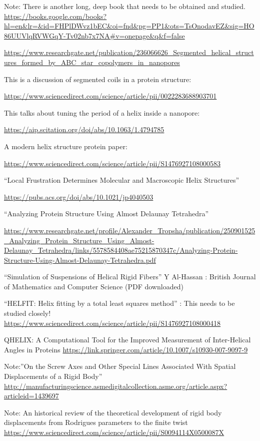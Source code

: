 \documentclass[11pt]{article}
\begin{document}
{Note: There is another long, deep book that needs to be obtained and studied\cite{sadoc2006geometrical}.
\url{https://books.google.com/books?hl=en&lr=&id=FHPlDWvz1bEC&oi=fnd&pg=PP1&ots=TsOnodavEZ&sig=HO86UUVlqRVWGqY-Tv02nb7x7NA#v=onepage&q&f=false}

\url{https://www.researchgate.net/publication/236066626_Segmented_helical_structures_formed_by_ABC_star_copolymers_in_nanopores}

This is a discussion of segmented coils in a protein structure:

\url{https://www.sciencedirect.com/science/article/pii/0022283688903701}

This talks about tuning the period of a helix inside a nanopore:

\url{https://aip.scitation.org/doi/abs/10.1063/1.4794785}

A modern helix structure protein paper:

\url{https://www.sciencedirect.com/science/article/pii/S1476927108000583}

``Local Frustration Determines Molecular and Macroscopic Helix Structures''

\url{https://pubs.acs.org/doi/abs/10.1021/jp4040503}

``Analyzing Protein Structure Using Almost Delaunay Tetrahedra''

\url{https://www.researchgate.net/profile/Alexander_Tropsha/publication/250901525_Analyzing_Protein_Structure_Using_Almost-Delaunay_Tetrahedra/links/5578584408ae75215870347c/Analyzing-Protein-Structure-Using-Almost-Delaunay-Tetrahedra.pdf}

``Simulation of Suspensions of Helical Rigid Fibers'' Y Al-Hassan : British Journal of Mathematics and Computer Science
(PDF downloaded)

``HELFIT: Helix fitting by a total least squares method'' : This needs to be studied closely!
\url{https://www.sciencedirect.com/science/article/pii/S1476927108000418}

QHELIX: A Computational Tool for the Improved Measurement of Inter-Helical Angles in Proteins
\url{https://link.springer.com/article/10.1007/s10930-007-9097-9}

Note:''On the Screw Axes and Other Special Lines Associated With Spatial Displacements of a Rigid Body''
\url{http://manufacturingscience.asmedigitalcollection.asme.org/article.aspx?articleid=1439697}

Note: An historical review of the theoretical development of rigid body displacements from Rodrigues parameters to the finite twist
\url{https://www.sciencedirect.com/science/article/pii/S0094114X0500087X}

}
\end{document}
